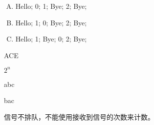 {    %
    \begin{practicec}
        \begin{enumerate}[A.]
            \item
            {
                Hello;
                0;
                1;
                Bye;
                2;
                Bye;
            }
            \item
            {
                Hello;
                1;
                0;
                Bye;
                2;
                Bye;
            }
            \item
            {
                Hello;
                1;
                Bye;
                0;
                2;
                Bye;
            }
        \end{enumerate}
    \end{practicec}

    \begin{practicec}
        ACE
    \end{practicec}

    \begin{practicec}
        $2^n$
    \end{practicec}

    \begin{practicec}

    \end{practicec}

    \begin{practicec}
        abc

        bac
    \end{practicec}

    \begin{practicec}

    \end{practicec}

    \begin{practicec}
        信号不排队，不能使用接收到信号的次数来计数。
    \end{practicec}

    \begin{practicec}

    \end{practicec}

    \begin{practicec}

    \end{practicec}

    \begin{practicec}

    \end{practicec}
}
